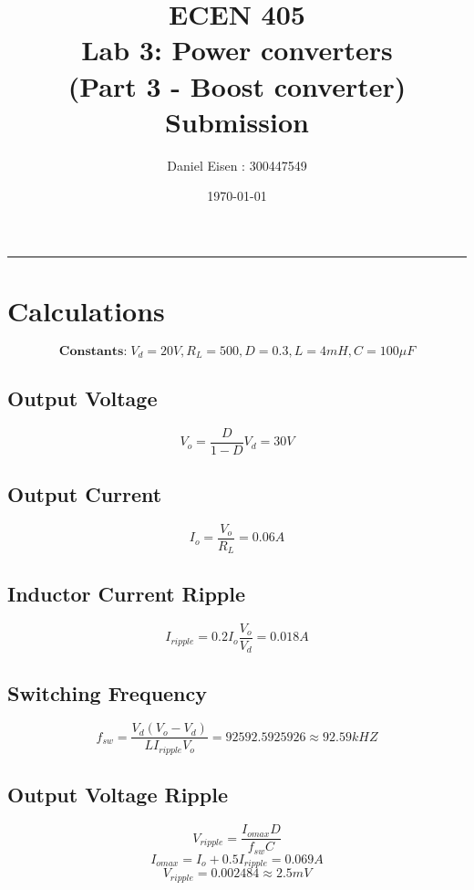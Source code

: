 \documentclass[11pt]{article}
\title{ECEN 405 \\ Lab 3: Power converters \\ (Part 3 - Boost converter) Submission}
\author{Daniel Eisen : 300447549}
\date{\today}
\begin{document}
\begin{preview}

    \maketitle
    \hrule
    \section{Calculations}
    $$\mathrm{\textbf{Constants:}} \; V_{d}=20V, R_L=500, D=0.3, L=4mH, C=100\mu F$$

    \subsection*{Output Voltage}
    $$V_o = \frac{D}{1-D}V_d = 30V$$

    \subsection*{Output Current}
    $$I_{o}=\frac{V_{o}}{R_{L}} = 0.06A$$

    \subsection*{Inductor Current Ripple}
    $$I_{ripple}=0.2I_{o}\frac{V_{o}}{V_{d}} = 0.018A$$

    \subsection*{Switching Frequency}
    $$f_{sw}=\frac{V_{d}\left(V_{o}-V_{d}\right)}{LI_{ripple}V_{o}} = 92592.5925926 \approx 92.59kHZ$$

    \subsection*{Output Voltage Ripple}
    $$V_{ripple}=\frac{I_{omax}D}{f_{sw}C}$$
    $$I_{omax}=I_{o}+0.5I_{ripple}=0.069A$$
    $$V_{ripple}=0.002484 \approx 2.5mV$$


\end{preview}
\end{document}
